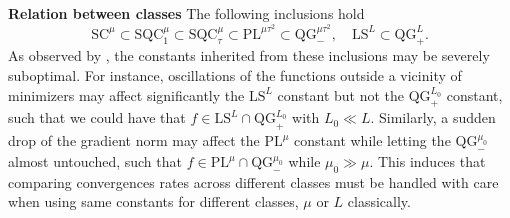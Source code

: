 \documentclass{article}
\def\pl{{\text{PL}^\mu}}
\newcommand{\sqc}{\text{SQC}_{\tau}^{\mu}}
\newcommand{\ls}{\text{LS}^{L}}
\newcommand{\strongconv}{\text{SC}^{\mu}}
\newcommand{\qg}{\text{QG}_{+}^{L_0}}
\newcommand{\qginf}{\text{QG}_{-}^{\mu_0}}
\newcommand{\qgf}[1]{\text{QG}_{+}^{#1}}
\newcommand{\qginff}[1]{\text{QG}_{-}^{#1}}
\newcommand{\sqcf}[2]{\text{SQC}_{#1}^{#2}}
\newcommand{\plf}[1]{\text{PL}^{#1}}
\theoremstyle{plain}
\theoremstyle{definition}
\theoremstyle{remark}
\begin{document}
\noindent
\textbf{Relation between classes \:}
The following inclusions hold \cite{karimi2016linear,hermant2024study}
\begin{equation}\label{eq:inclusions}
    \strongconv \subset \sqcf{1}{\mu} \subset{\sqc} \subset \plf{\mu\tau^2} \subset \qginff{\mu \tau^2},\quad \ls \subset \qgf{L}.
\end{equation}
    As observed by \cite{guille2021study}, the constants inherited from these inclusions may be severely suboptimal. For instance, oscillations of the functions outside a vicinity of minimizers may affect significantly the $\ls$ constant but not the $\qg$ constant, such that we could have that $f \in \ls \cap \qg$ with $L_0\ll L$. Similarly, a sudden drop of the gradient norm may affect the $\pl$ constant while letting the $\qginf$ almost untouched, such that $f \in \pl \cap \qginf$ while $\mu_0 \gg \mu$. This induces that comparing convergences rates across different classes  must be handled with care when using same constants for different classes, $\mu$ or $L$ classically. 
\end{document}
